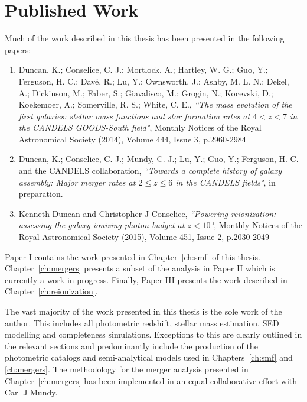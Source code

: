 %
%

\chapter*{Published Work}
Much of the work described in this thesis has been presented in the following papers:

\begin{enumerate}[I]
  \item Duncan, K.; Conselice, C. J.; Mortlock, A.; Hartley, W. G.; Guo, Y.; Ferguson, H. C.; Davé, R.; Lu, Y.; Ownsworth, J.; Ashby, M. L. N.; Dekel, A.; Dickinson, M.; Faber, S.; Giavalisco, M.; Grogin, N.; Kocevski, D.; Koekemoer, A.; Somerville, R. S.; White, C. E., \emph{``The mass evolution of the first galaxies: stellar mass functions and star formation rates at $4 < z < 7$ in the CANDELS GOODS-South field"}, Monthly Notices of the Royal Astronomical Society (2014), Volume 444, Issue 3, p.2960-2984
  
  \item Duncan, K.; Conselice, C. J.; Mundy, C. J.; Lu, Y.; Guo, Y.; Ferguson, H. C. and the CANDELS collaboration, \emph{``Towards a complete history of galaxy assembly: Major merger rates at $2 \leq z \leq 6$ in the CANDELS fields"}, in preparation.
  
  \item Kenneth Duncan and Christopher J Conselice, \emph{``Powering reionization: assessing the galaxy ionizing photon budget at $z < 10$"}, Monthly Notices of the Royal Astronomical Society (2015), Volume 451, Issue 2, p.2030-2049
\end{enumerate}

Paper I contains the work presented in Chapter~\ref{ch:smf} of this thesis. Chapter~\ref{ch:mergers} presents a subset of the analysis in Paper II which is currently a work in progress. Finally, Paper III presents the work described in Chapter~\ref{ch:reionization}.

The vast majority of the work presented in this thesis is the sole work of the author. This includes all photometric redshift, stellar mass estimation, SED modelling and completeness simulations. Exceptions to this are clearly outlined in the relevant sections and predominantly include the production of the photometric catalogs and semi-analytical models used in Chapters~\ref{ch:smf} and \ref{ch:mergers}. The methodology for the merger analysis presented in Chapter~\ref{ch:mergers} has been implemented in an equal collaborative effort with Carl J Mundy.

\clearpage





